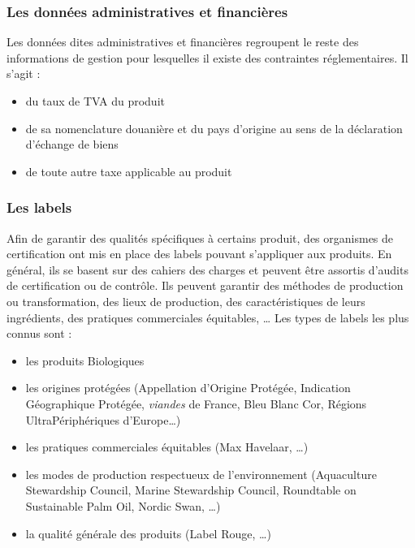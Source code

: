                 \subsubsection{Les données administratives et financières}

                Les données dites administratives et financières regroupent le reste des informations de gestion pour lesquelles il existe des contraintes réglementaires.
                Il s'agit :
                \begin{itemize}
                    \item du taux de TVA du produit
                    \item de sa nomenclature douanière et du pays d'origine au sens de la déclaration d'échange de biens\cite{notions_DEB}
                    \item de toute autre taxe applicable au produit
                \end{itemize}

                \subsubsection{Les labels} 
                \label{labels}

                Afin de garantir des qualités spécifiques à certains produit, des organismes de certification ont mis en place des labels pouvant s'appliquer aux produits.
                En général, ils se basent sur des cahiers des charges et peuvent être assortis d'audits de certification ou de contrôle.
                Ils peuvent garantir des méthodes de production ou transformation, des lieux de production, des caractéristiques de leurs ingrédients, des pratiques commerciales équitables, \dots
                Les types de labels les plus connus sont :
                \begin{itemize}
                    \item les produits Biologiques
                    \item les origines protégées (Appellation d'Origine Protégée, Indication Géographique Protégée, \emph{viandes} de France, Bleu Blanc Cor, Régions UltraPériphériques d'Europe\dots)
                    \item les pratiques commerciales équitables (Max Havelaar, \dots)
                    \item les modes de production respectueux de l'environnement (Aquaculture Stewardship Council, Marine Stewardship Council, Roundtable on Sustainable Palm Oil, Nordic Swan, \dots)
                    \item la qualité \og générale \fg des produits (Label Rouge, \dots)
                \end{itemize}

